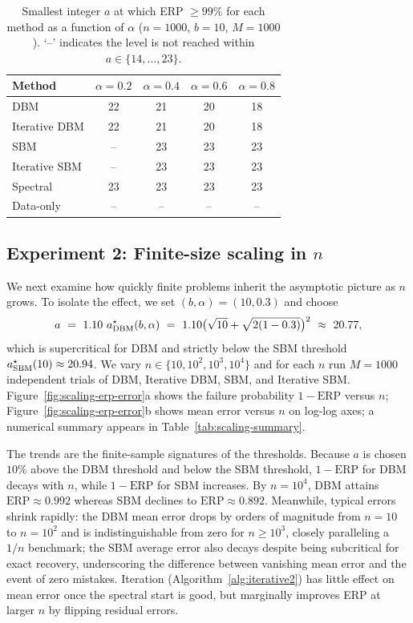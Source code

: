 \documentclass[11pt]{article}
\theoremstyle{plain}
\theoremstyle{definition}
\begin{document}
\begin{table}[t]
\centering
\small
\begin{tabular}{lcccc}
\toprule
Method & $\alpha=0.2$ & $\alpha=0.4$ & $\alpha=0.6$ & $\alpha=0.8$ \\
\midrule
DBM & 22 & 21 & 20 & 18 \\
Iterative DBM & 22 & 21 & 20 & 18 \\
SBM & -- & 23 & 23 & 23 \\
Iterative SBM & -- & 23 & 23 & 23 \\
Spectral & 23 & 23 & 23 & 23 \\
Data-only & -- & -- & -- & -- \\
\bottomrule
\end{tabular}
\caption{Smallest integer $a$ at which ERP $\ge 99\%$ for each method as a function of $\alpha$ ($n=1000$, $b=10$, $M=1000$). `--' indicates the level is not reached within $a\in\{14,\dots,23\}$.}
\label{tab:erp99}
\end{table}

\subsection{Experiment 2: Finite-size scaling in $n$}

We next examine how quickly finite problems inherit the asymptotic picture as $n$ grows. To isolate the effect, we set $(b,\alpha)=(10,0.3)$ and choose
\[
a \ =\  1.10\  a^\star_{\rm DBM}(b,\alpha)
\ =\  1.10\big(\sqrt{10}+\sqrt{2(1-0.3)}\big)^2
\ \approx\  20.77,
\]
which is supercritical for DBM and strictly below the SBM threshold $a^\star_{\rm SBM}(10)\approx 20.94$. We vary $n\in\{10,10^2,10^3,10^4\}$ and for each $n$ run $M=1000$ independent trials of DBM, Iterative DBM, SBM, and Iterative SBM. Figure~\ref{fig:scaling-erp-error}a shows the failure probability $1-\mathrm{ERP}$ versus $n$; Figure~\ref{fig:scaling-erp-error}b shows mean error versus $n$ on log-log axes; a numerical summary appears in Table~\ref{tab:scaling-summary}.

The trends are the finite-sample signatures of the thresholds. Because $a$ is chosen $10\%$ above the DBM threshold and below the SBM threshold, $1-\mathrm{ERP}$ for DBM decays with $n$, while $1-\mathrm{ERP}$ for SBM increases. By $n=10^4$, DBM attains $\mathrm{ERP}\approx 0.992$ whereas SBM declines to $\mathrm{ERP}\approx 0.892$. Meanwhile, typical errors shrink rapidly: the DBM mean error drops by orders of magnitude from $n=10$ to $n=10^2$ and is indistinguishable from zero for $n\ge 10^3$, closely paralleling a $1/n$ benchmark; the SBM average error also decays despite being subcritical for exact recovery, underscoring the difference between vanishing mean error and the event of zero mistakes. Iteration (Algorithm~\ref{alg:iterative2}) has little effect on mean error once the spectral start is good, but marginally improves ERP at larger $n$ by flipping residual errors.
\end{document}
